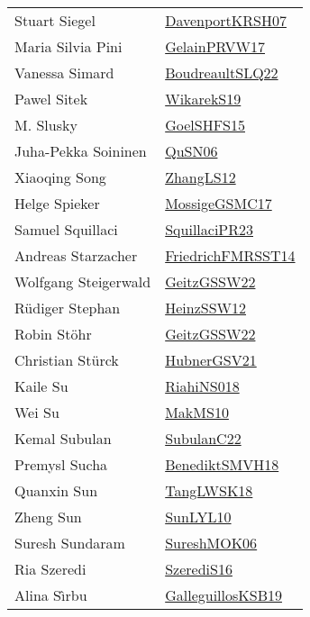 {\begin{longtable}{p{4cm}p{20cm}}
Stuart Siegel & \href{papers/DavenportKRSH07.pdf}{DavenportKRSH07}\cite{DavenportKRSH07} \\
Maria Silvia Pini & \href{papers/GelainPRVW17.pdf}{GelainPRVW17}\cite{GelainPRVW17} \\
Vanessa Simard & \href{papers/BoudreaultSLQ22.pdf}{BoudreaultSLQ22}\cite{BoudreaultSLQ22} \\
Pawel Sitek & \href{articles/WikarekS19.pdf}{WikarekS19}\cite{WikarekS19} \\
M. Slusky & \href{articles/GoelSHFS15.pdf}{GoelSHFS15}\cite{GoelSHFS15} \\
Juha{-}Pekka Soininen & \href{papers/QuSN06.pdf}{QuSN06}\cite{QuSN06} \\
Xiaoqing Song & \href{papers/ZhangLS12.pdf}{ZhangLS12}\cite{ZhangLS12} \\
Helge Spieker & \href{papers/MossigeGSMC17.pdf}{MossigeGSMC17}\cite{MossigeGSMC17} \\
Samuel Squillaci & \href{papers/SquillaciPR23.pdf}{SquillaciPR23}\cite{SquillaciPR23} \\
Andreas Starzacher & \href{}{FriedrichFMRSST14}\cite{FriedrichFMRSST14} \\
Wolfgang Steigerwald & \href{papers/GeitzGSSW22.pdf}{GeitzGSSW22}\cite{GeitzGSSW22} \\
R{\"{u}}diger Stephan & \href{articles/HeinzSSW12.pdf}{HeinzSSW12}\cite{HeinzSSW12} \\
Robin St{\"{o}}hr & \href{papers/GeitzGSSW22.pdf}{GeitzGSSW22}\cite{GeitzGSSW22} \\
Christian St{\"{u}}rck & \href{articles/HubnerGSV21.pdf}{HubnerGSV21}\cite{HubnerGSV21} \\
Kaile Su & \href{}{RiahiNS018}\cite{RiahiNS018} \\
Wei Su & \href{papers/MakMS10.pdf}{MakMS10}\cite{MakMS10} \\
Kemal Subulan & \href{articles/SubulanC22.pdf}{SubulanC22}\cite{SubulanC22} \\
Premysl Sucha & \href{papers/BenediktSMVH18.pdf}{BenediktSMVH18}\cite{BenediktSMVH18} \\
Quanxin Sun & \href{}{TangLWSK18}\cite{TangLWSK18} \\
Zheng Sun & \href{papers/SunLYL10.pdf}{SunLYL10}\cite{SunLYL10} \\
Suresh Sundaram & \href{}{SureshMOK06}\cite{SureshMOK06} \\
Ria Szeredi & \href{papers/SzerediS16.pdf}{SzerediS16}\cite{SzerediS16} \\
Alina S{\^{\i}}rbu & \href{papers/GalleguillosKSB19.pdf}{GalleguillosKSB19}\cite{GalleguillosKSB19} \\

\end{longtable}}
